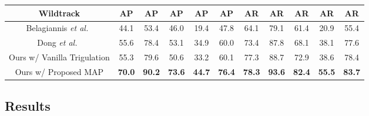 \documentclass[runningheads]{llncs}
\begin{document}
\begin{table*}[!ht]
\begin{center}
\begin{tabular}{c|c|cccc|c|cccc}
\hline
Wildtrack &\textbf{AP} & AP & AP & AP &  AP & \textbf{AR} & AR & AR & AR &  AR\\
\hline\hline
Belagiannis \textit{et al.}~\cite{Authors42} & 44.1 & 53.4 & 46.0 & 19.4 & 47.8 & 64.1 & 79.1 & 61.4 & 20.9 &55.4 \\
Dong \textit{et al.}~\cite{Authors26} & 55.6 & 78.4 & 53.1 & 34.9 & 60.0& 73.4 & 87.8 & 68.1 & 38.1 & 77.6 \\
Ours w/ Vanilla Trigulation & 55.3 & 79.6 & 50.6 & 33.2 & 60.1 & 77.3 & 88.7 & 72.9 & 38.6 &78.4 \\
Ours w/ Proposed MAP & \textbf{70.0} & \textbf{90.2} & \textbf{73.6} & \textbf{44.7} & \textbf{76.4} & \textbf{78.3} & \textbf{93.6} & \textbf{82.4} & \textbf{55.5} & \textbf{83.7} \\
\hline
\end{tabular}
\end{center}
\label{tab:1}
\end{table*}
\vspace{-1.0cm} 
\subsection{Results}
\end{document}
